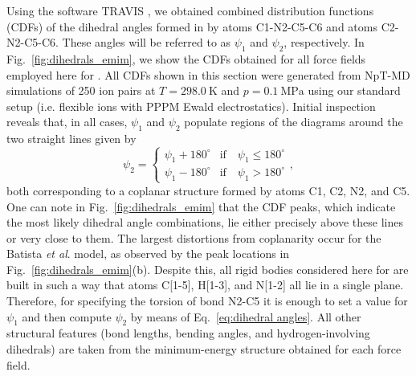 \documentclass[3p,twocolumn]{elsarticle}
\begin{document}
Using the software TRAVIS \cite{Brehm_2011}, we obtained combined distribution functions (CDFs) of the dihedral angles formed in \ce{[emim]^+} by atoms C1-N2-C5-C6 and atoms C2-N2-C5-C6.
These angles will be referred to as $\psi_1$ and $\psi_2$, respectively.
In Fig.~\ref{fig:dihedrals_emim}, we show the CDFs obtained for all force fields employed here for \ce{[emim][B(CN)_4]}.
All CDFs shown in this section were generated from NpT-MD simulations of 250 ion pairs at $T = 298.0~\mathrm{K}$ and $p = 0.1~\mathrm{MPa}$ using our standard setup (i.e. flexible ions with PPPM Ewald electrostatics).
Initial inspection reveals that, in all cases, $\psi_1$ and $\psi_2$ populate regions of the diagrams around the two straight lines given by
\begin{equation}
\label{eq:dihedral angles}
\psi_2 = \begin{cases}
\psi_1 + 180^\circ & \text{if} \quad \psi_1 \leq 180^\circ \\
\psi_1 - 180^\circ & \text{if} \quad \psi_1 > 180^\circ
\end{cases},
\end{equation}
both corresponding to a coplanar structure formed by atoms C1, C2, N2, and C5.
One can note in Fig.~\ref{fig:dihedrals_emim} that the CDF peaks, which indicate the most likely dihedral angle combinations, lie either precisely above these lines or very close to them.
The largest distortions from coplanarity occur for the Batista \textit{et al}. \cite{Batista_2015} model, as observed by the peak locations in Fig.~\ref{fig:dihedrals_emim}(b).
Despite this, all rigid bodies considered here for \ce{[emim]^+} are built in such a way that atoms C[1-5], H[1-3], and N[1-2] all lie in a single plane.
Therefore, for specifying the torsion of bond N2-C5 it is enough to set a value for $\psi_1$ and then compute $\psi_2$ by means of Eq.~\eqref{eq:dihedral angles}.
All other structural features (bond lengths, bending angles, and hydrogen-involving dihedrals) are taken from the minimum-energy structure obtained for each force field.
\end{document}
